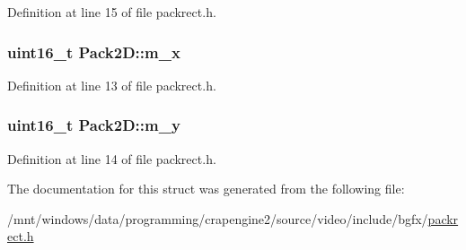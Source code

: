 Definition at line 15 of file packrect.\+h.

\hypertarget{struct_pack2_d_af33f3d953ee7c8259da95c9b2d7caca8}{
\subsubsection[{m\+\_\+x}]{\setlength{\rightskip}{0pt plus 5cm}uint16\+\_\+t Pack2\+D\+::m\+\_\+x}}\label{struct_pack2_d_af33f3d953ee7c8259da95c9b2d7caca8}


Definition at line 13 of file packrect.\+h.

\hypertarget{struct_pack2_d_ac81ac16b77051195d5370eb867d205a7}{
\subsubsection[{m\+\_\+y}]{\setlength{\rightskip}{0pt plus 5cm}uint16\+\_\+t Pack2\+D\+::m\+\_\+y}}\label{struct_pack2_d_ac81ac16b77051195d5370eb867d205a7}


Definition at line 14 of file packrect.\+h.



The documentation for this struct was generated from the following file\+:\begin{DoxyCompactItemize}
\item 
/mnt/windows/data/programming/crapengine2/source/video/include/bgfx/\hyperlink{packrect_8h}{packrect.\+h}\end{DoxyCompactItemize}
